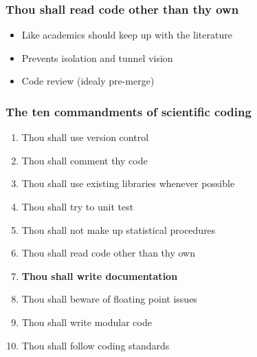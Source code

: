\documentclass[slidestop]{beamer}
\begin{document}
\begin{frame}
  \frametitle{Thou shall read code other than thy own}
  \begin{itemize}
    \item Like academics should keep up with the literature
    \item Prevents isolation and tunnel vision
    \item Code review (idealy pre-merge)
  \end{itemize}
\end{frame}

\begin{frame}
  \frametitle{The ten commandments of scientific coding}
  \begin{enumerate}
    \item Thou shall use version control
    \item Thou shall comment thy code
    \item Thou shall use existing libraries whenever possible
    \item Thou shall try to unit test
    \item Thou shall not make up statistical procedures
    \item Thou shall read code other than thy own
    \item {\bf Thou shall write documentation}
    \item Thou shall beware of floating point issues
    \item Thou shall write modular code
    \item Thou shall follow coding standards
  \end{enumerate}
\end{frame}

{
  \frame{}
}
\end{document}
